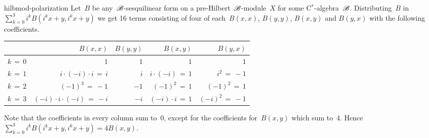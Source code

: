 \begin{solution}{hilbmod-polarization}%
Let~$B$ be any~$\mathscr{B}$-sesquilinear form on a pre-Hilbert~$\mathscr{B}$-module~$X$
    for some C$^*$-algebra~$\mathscr{B}$.
    Distributing~$B$ in~$\sum_{k=0}^3 i^k B(i^k x+y, i^k x+y)$
    we get 16 terms
    consisting of four of each~$B(x,x)$, $B(y,y)$, $B(x,y)$ and $B(y,x)$
    with the following coefficients.
    \begin{center}
        \begin{tabular}{c|rrrr}
        & $B(x,x)$ & $B(y,y)$ & $B(x,y)$ & $B(y,x)$\\ \hline
        $k\,=\,0$ & $1$ & $1$ & $1$ & $1$ \\
        $k\,=\,1$ & $i\cdot (-i)\cdot i\,=\,i$ & $i$ & $i \cdot (-i)\,=\,1$ & $i^2 \,=\, -1$ \\
        $k\,=\,2$ & $(-1)^3\,=\,-1 $&$ -1 $&$ (-1)^2 \,=\,1$&$ (-1)^2\,=\,1$ \\
            $k\,=\,3$ & $(-i) \cdot i \cdot (-i)\,=\,-i $&$ -i $&$ (-i)\cdot i\,=\, 1$&$ (-i)^2\,=\,-1 $\\
    \end{tabular}
\end{center}
    Note that the coefficients in
    every column sum to~$0$, except for the coefficients for~$B(x,y)$ which
    sum to~$4$.
    Hence~$ \sum_{k=0}^3 i^k B(i^k x+y, i^k x+y) = 4B(x,y)$.
\end{solution}
